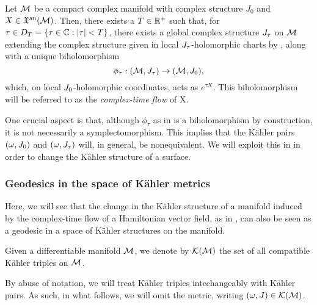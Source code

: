 \documentclass[notas.tex]{subfiles} 				%
\begin{document}

\begin{thm} \label{thm_complex_flow}
Let $\mathcal{M}$ be a compact complex manifold with complex structure $J_0$ and $X\in\mathfrak{X}^{\text{an}}(\mathcal{M})$. Then, there exists a $T \in \mathbb{R}^+$ such that, for $\tau \in D_T=\{\tau \in \mathbb{C} : \left|\tau\right| < T\}$, there exists a global complex structure $J_\tau$ on $\mathcal{M}$ extending the complex structure given in local $J_\tau$-holomorphic charts by , along with a unique biholomorphism
\[
\phi_\tau : (\mathcal{M}, J_\tau) \to (\mathcal{M}, J_0),
\]
which, on local $J_0$-holomorphic coordinates, acts as $e^{\tau X}$. This biholomorphism will be referred to as the \emph{complex-time flow} of X.
\end{thm}
\begin{rem}\label{rem_geometry_evolution}
	One crucial aspect is that, although $\phi_\tau$ as in  is a biholomorphism by construction, it is not necessarily a symplectomorphism. This implies that the Kähler pairs $(\omega, J_0)$ and $(\omega, J_\tau)$ will, in general, be nonequivalent. We will exploit this in  in order to change the Kähler structure of a surface.
\end{rem}

\subsubsection{Geodesics in the space of Kähler metrics} \label{sec_geodesics}

Here, we will see that the change in the Kähler structure of a manifold induced by the complex-time flow of a Hamiltonian vector field, as in , can also be seen as a geodesic in a space of Kähler structures on the manifold.

\begin{defn}
Given a differentiable manifold $\mathcal{M}$, we denote by 	$\mathcal{K}(\mathcal{M})$ the set of all compatible Kähler triples on $\mathcal{M}$.	
\end{defn}

By abuse of notation, we will treat Kähler triples intechangeably with Kähler pairs. As such, in what follows, we will omit the metric, writing $(\omega,J) \in \mathcal{K}(\mathcal{M})$.
\end{document}
